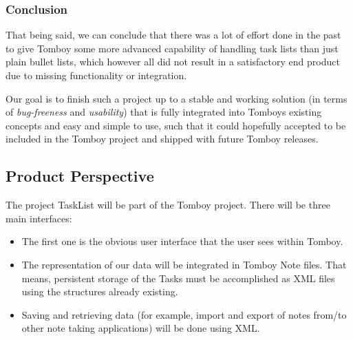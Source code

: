 \subsubsection{Conclusion}
\label{integration}
That being said, we can conclude that there was a lot of effort done in the past to give Tomboy some more advanced capability of handling task lists than just plain bullet lists, which however all did not result in a satisfactory end product due to missing functionality or integration.

Our goal is to finish such a project up to a stable and working solution (in terms of \textit{bug-freeness} and \textit{usability}) that is fully integrated into Tomboys existing concepts and easy and simple to use, such that it could hopefully accepted to be included in the Tomboy project and shipped with future Tomboy releases.

\subsection{Product Perspective}
\label{description:perspective}
  The project TaskList will be part of the Tomboy project. There will be three main interfaces:

  \begin{itemize}
    \item The first one is the obvious user interface that the user sees within Tomboy.
    \item The representation of our data will be integrated in Tomboy Note files. That means, persistent storage of the Tasks must be accomplished as XML files using the structures already existing.
    \item Saving and retrieving data (for example, import and export of notes from/to other note taking applications) will be done using XML.
  \end{itemize}

